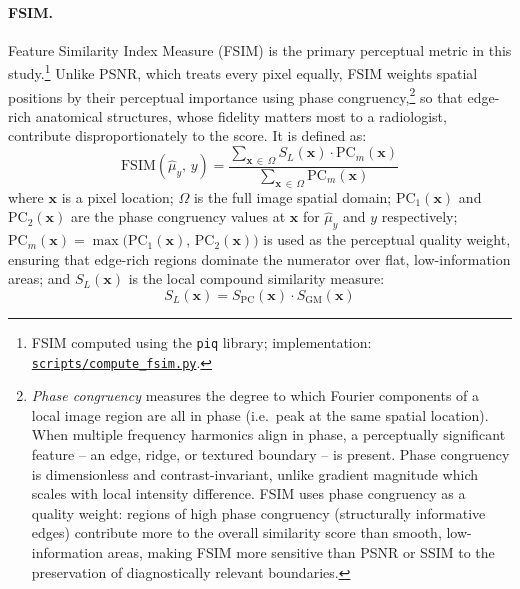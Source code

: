 \documentclass[12pt, a4paper, twoside, openright]{book}
\begin{document}
\paragraph{FSIM.}
Feature Similarity Index Measure (FSIM) \cite{zhang_fsim_2011} is the primary perceptual
metric in this study.\footnote{FSIM computed using the \texttt{piq} library; implementation: \href{https://github.com/teklesam/ppva_hformer_codebase/blob/main/scripts/compute_fsim.py}{\texttt{scripts/compute\_fsim.py}}.} Unlike PSNR, which treats every pixel equally, FSIM weights spatial
positions by their perceptual importance using phase congruency,\footnote{\emph{Phase congruency} \cite{morrone_feature_1987} measures the degree to which Fourier components of a local image region are all in phase (i.e.\ peak at the same spatial location). When multiple frequency harmonics align in phase, a perceptually significant feature -- an edge, ridge, or textured boundary -- is present. Phase congruency is dimensionless and contrast-invariant, unlike gradient magnitude which scales with local intensity difference. FSIM \cite{zhang_fsim_2011} uses phase congruency as a quality weight: regions of high phase congruency (structurally informative edges) contribute more to the overall similarity score than smooth, low-information areas, making FSIM more sensitive than PSNR or SSIM to the preservation of diagnostically relevant boundaries.} so that
edge-rich anatomical structures, whose fidelity matters most to a radiologist, contribute
disproportionately to the score. It is defined as:
\begin{equation}
\label{eq:methods:fsim}
\mathrm{FSIM}(\hat{\mu}_y,\,y)
  = \frac{\displaystyle\sum_{\mathbf{x}\,\in\,\Omega}
          S_L(\mathbf{x})\cdot\mathrm{PC}_m(\mathbf{x})}
         {\displaystyle\sum_{\mathbf{x}\,\in\,\Omega}
          \mathrm{PC}_m(\mathbf{x})}
\end{equation}
where $\mathbf{x}$ is a pixel location; $\Omega$ is the full image spatial domain;
$\mathrm{PC}_1(\mathbf{x})$ and $\mathrm{PC}_2(\mathbf{x})$ are the phase congruency
values at $\mathbf{x}$ for $\hat{\mu}_y$ and $y$ respectively; $\mathrm{PC}_m(\mathbf{x})
= \max\bigl(\mathrm{PC}_1(\mathbf{x}),\,\mathrm{PC}_2(\mathbf{x})\bigr)$ is used as the
perceptual quality weight, ensuring that edge-rich regions dominate the numerator over
flat, low-information areas; and $S_L(\mathbf{x})$ is the local compound similarity measure:
\begin{equation}
\label{eq:methods:fsim_sl}
S_L(\mathbf{x})
  = S_\mathrm{PC}(\mathbf{x})\cdot S_\mathrm{GM}(\mathbf{x})
\end{equation}
\end{document}
